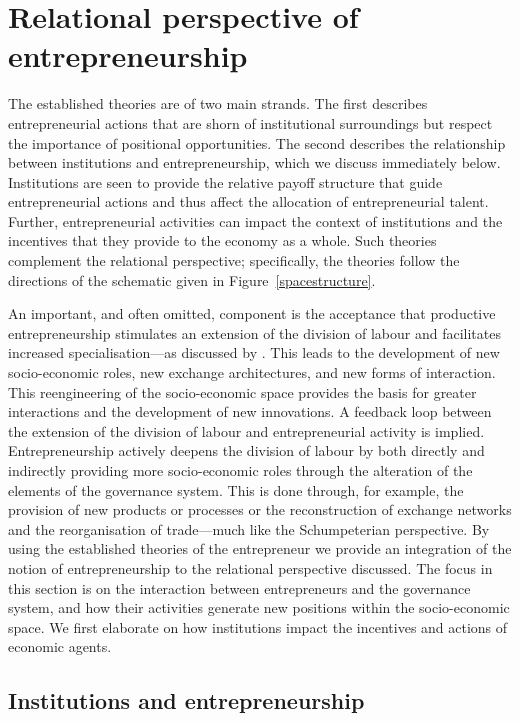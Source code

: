 \section{Relational perspective of entrepreneurship}
\label{sec:RPEntrepreneurship}

The established theories are of two main strands. The first describes entrepreneurial actions that are shorn of institutional surroundings but respect the importance of positional opportunities. The second describes the relationship between institutions and entrepreneurship, which we discuss immediately below. Institutions are seen to provide the relative payoff structure that guide entrepreneurial actions and thus affect the allocation of entrepreneurial talent. Further, entrepreneurial activities can impact the context of institutions and the incentives that they provide to the economy as a whole. Such theories complement the relational perspective; specifically, the theories follow the directions of the schematic given in Figure~\ref{spacestructure}. 

An important, and often omitted, component is the acceptance that productive entrepreneurship stimulates an extension of the division of labour and facilitates increased specialisation---as discussed by \citet{Smith1776}. This leads to the development of new socio-economic roles, new exchange architectures, and new forms of interaction. This reengineering of the socio-economic space provides the basis for greater interactions and the development of new innovations. A feedback loop between the extension of the division of labour and entrepreneurial activity is implied. Entrepreneurship actively deepens the division of labour by both directly and indirectly providing more socio-economic roles through the alteration of the elements of the governance system. This is done through, for example, the provision of new products or processes or the reconstruction of exchange networks and the reorganisation of trade---much like the Schumpeterian perspective. By using the established theories of the entrepreneur we provide an integration of the notion of entrepreneurship to the relational perspective discussed. The focus in this section is on the interaction between entrepreneurs and the governance system, and how their activities generate new positions within the socio-economic space. We first elaborate on how institutions impact the incentives and actions of economic agents.

\subsection{Institutions and entrepreneurship} \label{entrepreneurshipInstitutions}

